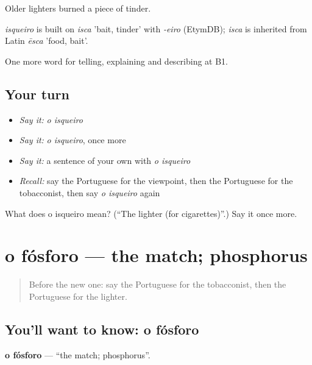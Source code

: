 Older lighters burned a piece of tinder.

\begin{cousinweb}
\emph{isqueiro} is built on \emph{isca} 'bait, tinder' with \emph{-eiro} (EtymDB); \emph{isca} is inherited from Latin \emph{ēsca} 'food, bait'.
\end{cousinweb}

\begin{grammarlens}[title={What you've built}]
One more word for telling, explaining and describing at B1.
\end{grammarlens}

\subsection*{Your turn}
\begin{itemize}
\raggedright
  \item \emph{Say it:} \emph{o isqueiro}
  \item \emph{Say it:} \emph{o isqueiro}, once more
  \item \emph{Say it:} a sentence of your own with \emph{o isqueiro}
  \item \emph{Recall:} say the Portuguese for the viewpoint, then the Portuguese for the tobacconist, then say \emph{o isqueiro} again
\end{itemize}

\begin{tcolorbox}[breakable,colback=teal!4,colframe=teal!35!black,title={Before you move on}]
What does o isqueiro mean? (\textquotedblleft{}The lighter (for cigarettes)\textquotedblright{}.) Say it once more.
\end{tcolorbox}
\section[o fósforo]{o fósforo — the match; phosphorus}

\label{lesson:PT-C448-fosforo}



\begin{quote}
Before the new one: say the Portuguese for the tobacconist, then the Portuguese for the lighter.
\end{quote}

\subsection*{You'll want to know: o fósforo}
\textbf{o fósforo} — \textquotedblleft{}the match; phosphorus\textquotedblright{}.


